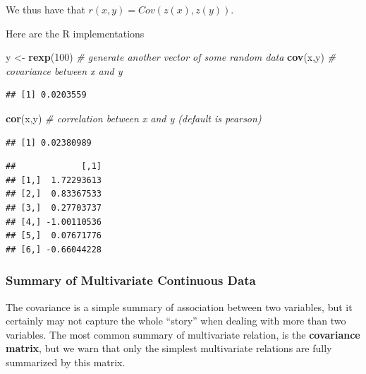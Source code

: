 \documentclass[]{book}
\newenvironment{Shaded}{\begin{snugshade}}{\end{snugshade}}
\newcommand{\CommentTok}[1]{\textcolor[rgb]{0.56,0.35,0.01}{\textit{#1}}}
\newcommand{\DecValTok}[1]{\textcolor[rgb]{0.00,0.00,0.81}{#1}}
\newcommand{\KeywordTok}[1]{\textcolor[rgb]{0.13,0.29,0.53}{\textbf{#1}}}
\newcommand{\NormalTok}[1]{#1}
\newcommand{\OperatorTok}[1]{\textcolor[rgb]{0.81,0.36,0.00}{\textbf{#1}}}
\newcommand{\StringTok}[1]{\textcolor[rgb]{0.31,0.60,0.02}{#1}}
\theoremstyle{definition}
\theoremstyle{definition}
\theoremstyle{definition}
\theoremstyle{remark}
\begin{document}
We thus have that \(r(x,y)=Cov(z(x),z(y))\).

Here are the R implementations

\begin{Shaded}
\begin{Highlighting}[]
\NormalTok{y <-}\StringTok{ }\KeywordTok{rexp}\NormalTok{(}\DecValTok{100}\NormalTok{) }\CommentTok{# generate another vector of some random data}
\KeywordTok{cov}\NormalTok{(x,y) }\CommentTok{# covariance between x and y}
\end{Highlighting}
\end{Shaded}

\begin{verbatim}
## [1] 0.0203559
\end{verbatim}

\begin{Shaded}
\begin{Highlighting}[]
\KeywordTok{cor}\NormalTok{(x,y) }\CommentTok{# correlation between x and y (default is pearson)}
\end{Highlighting}
\end{Shaded}

\begin{verbatim}
## [1] 0.02380989
\end{verbatim}

\begin{Shaded}
\end{Shaded}

\begin{verbatim}
##             [,1]
## [1,]  1.72293613
## [2,]  0.83367533
## [3,]  0.27703737
## [4,] -1.00110536
## [5,]  0.07671776
## [6,] -0.66044228
\end{verbatim}

\hypertarget{summary-of-multivariate-continuous-data}{%
\subsubsection{Summary of Multivariate Continuous Data}\label{summary-of-multivariate-continuous-data}}

The covariance is a simple summary of association between two variables, but it certainly may not capture the whole ``story'' when dealing with more than two variables.
The most common summary of multivariate relation, is the \textbf{covariance matrix}, but we warn that only the simplest multivariate relations are fully summarized by this matrix.
\end{document}
